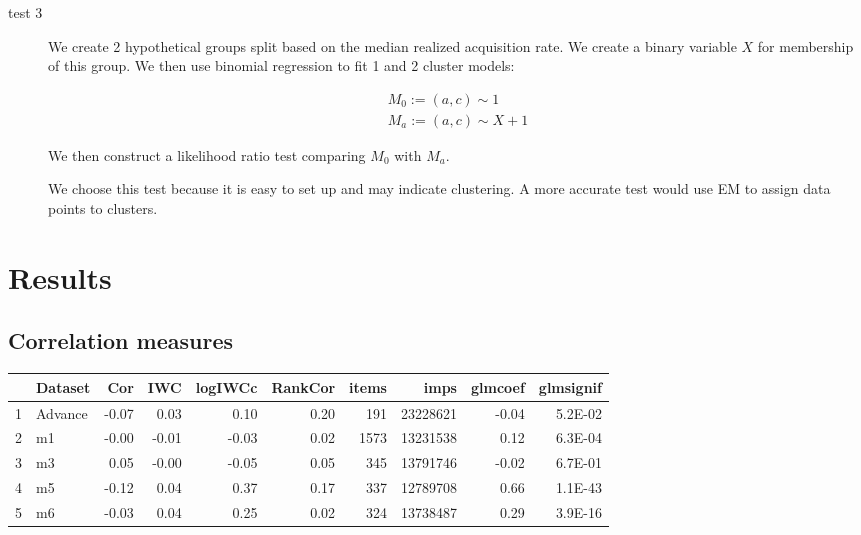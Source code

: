 \documentclass[11pt,a4,singlespacing,titlepagenumber=on]{scrreprt}
\numberwithin{equation}{chapter} %
\theoremstyle{remark}
\begin{document}
\begin{description}
	\item[test 3] We create 2 hypothetical groups split based on the median realized acquisition rate. We create a binary variable $X$ for membership of this group. We then use binomial regression to fit 1 and 2 cluster models:

\begin{align}
	M_0 := (a,c) \sim 1 \\
	M_a := (a,c) \sim X + 1
\end{align}

We then construct a likelihood ratio test comparing $M_0$ with $M_a$. 

We choose this test because it is easy to set up and may indicate clustering. A more accurate test would use EM to assign data points to clusters.
%
%
%
%
%
\end{description}

\section{Results}
\subsection{Correlation measures}


\begin{table}[ht]
\centering
\begin{tabular}{rlrrrrrrrr}
  \hline
 & Dataset & Cor & IWC & logIWCc & RankCor & items & imps & glmcoef & glmsignif \\ 
  \hline
  1 & Advance & -0.07 & 0.03 & 0.10 & 0.20 & 191 & 23228621 & -0.04 & 5.2E-02 \\ 
  2 & m1 & -0.00 & -0.01 & -0.03 & 0.02 & 1573 & 13231538 & 0.12 & 6.3E-04 \\ 
  3 & m3 & 0.05 & -0.00 & -0.05 & 0.05 & 345 & 13791746 & -0.02 & 6.7E-01 \\ 
  4 & m5 & -0.12 & 0.04 & 0.37 & 0.17 & 337 & 12789708 & 0.66 & 1.1E-43 \\ 
  5 & m6 & -0.03 & 0.04 & 0.25 & 0.02 & 324 & 13738487 & 0.29 & 3.9E-16 \\ 
   \hline
\end{tabular}
\end{table}
\end{document}
